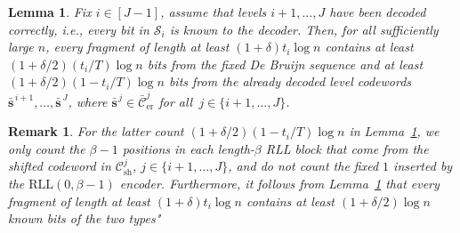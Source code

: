 \documentclass[journal,letterpaper,onecolumn,11pt]{IEEEtran}
\newcommand{\cC}{\mathcal{C}}
\newcommand{\cS}{\mathcal{S}}
\newcommand{\bolds}{\mathbf{s}}
\newtheorem{remark}{Remark}
\newtheorem{lemma}{Lemma}
\begin{document}
\begin{lemma}\label{lemma:usable-level-signature}
Fix $i\in[J-1]$, assume that levels $i+1,\ldots,J$ have been decoded correctly, i.e., every bit in $\cS_i$ is known to the decoder.
Then, for all sufficiently large $n$, every fragment of length at least
$(1+\delta)t_i\log n$ contains at least $(1+\delta/2)(t_i/T)\log n$ bits from the fixed De Bruijn sequence and at least $(1+\delta/2)(1-t_i/T)\log n$ bits from the already decoded level codewords $\bar{\bolds}^{\,i+1},\ldots,\bar{\bolds}^{\,J}$, where
$\bar{\bolds}^{\,j}\in\bar{\cC}_{\mathrm{er}}^j$ for all~$j\in\{i+1,\ldots,J\}$.
\end{lemma}
\begin{remark}\label{remark:special bits in S_j}
For the latter count $(1+\delta/2)(1-t_i/T)\log n$ in Lemma~\ref{lemma:usable-level-signature}, we only count the $\beta-1$ positions in each
length-$\beta$ RLL block that come from the shifted codeword in
$\cC_{\mathrm{sh}}^j$, $j\in\{i+1,\ldots,J\}$, and do not count the fixed $1$ inserted by the $\mathrm{RLL}(0,\beta-1)$ encoder.
Furthermore, it follows from Lemma~\ref{lemma:usable-level-signature} that every fragment of length at least $(1+\delta)t_i\log n$ contains at least $(1+\delta/2)\log n$ known bits of the two types"
\end{remark}
\end{document}

